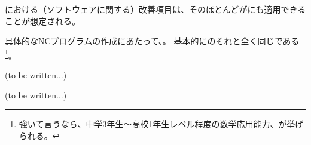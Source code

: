 

\MMC における（ソフトウェアに関する）改善項目は、そのほとんどが\DMC にも適用できることが想定される。


具体的なNCプログラムの作成にあたって、。
基本的に\MMC のそれと全く同じである
\footnote{強いて言うなら、中学3年生～高校1年生レベル程度の数学応用能力、が挙げられる。}。



(to be written...)



(to be written...)

